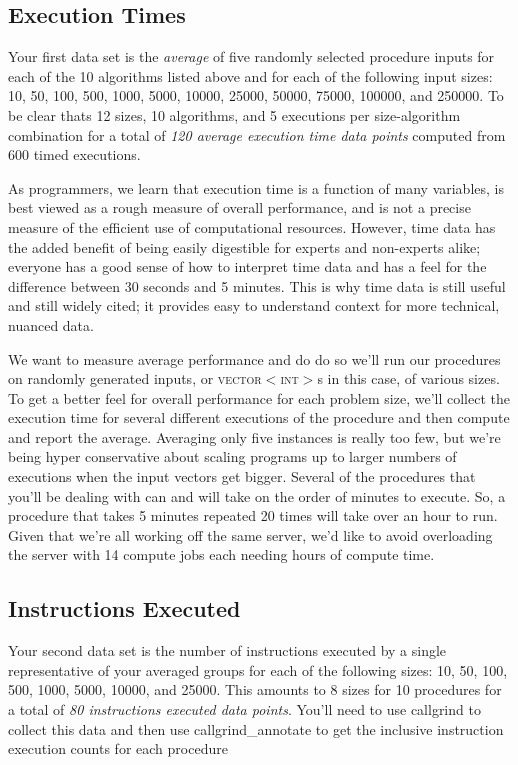 \documentclass[]{tufte-handout}
\begin{document}
\subsection{Execution Times}

Your first data set is the \textit{average} of five randomly selected procedure inputs for each of the 10 algorithms listed above and for each of the following input sizes: 10, 50, 100, 500, 1000, 5000, 10000, 25000, 50000, 75000, 100000, and 250000. To be clear thats 12 sizes, 10 algorithms, and 5 executions per size-algorithm combination for a total of \textit{120 average execution time data points} computed from 600 timed executions.

As programmers, we learn that execution time is a function of many variables, is best viewed as a rough measure of overall performance, and is not a precise measure of the efficient use of computational resources.  However, time data has the added benefit of being easily digestible for experts and non-experts alike; everyone has a good sense of how to interpret time data and has a feel for the difference between 30 seconds and 5 minutes. This is why time data is still useful and still widely cited; it provides easy to understand context for more technical, nuanced data.

We want to measure average performance and do do so we'll run our procedures on randomly generated inputs, or \textsc{vector$<$int$>$}s in this case, of various sizes. To get a better feel for overall performance for each problem size, we'll collect the execution time for several different executions of the procedure and then compute and report the average. Averaging only five instances is really too few, but we're being hyper conservative about scaling programs up to larger numbers of executions when the input vectors get bigger. Several of the procedures that you'll be dealing with can and will take on the order of minutes to execute. So, a procedure that takes 5 minutes repeated 20 times will take over an hour to run. Given that we're all working off the same server, we'd like to avoid overloading the server with 14 compute jobs each needing hours of compute time.

\subsection{Instructions Executed}

Your second data set is the number of instructions executed by a single representative of your averaged groups for each of the following sizes: 10, 50, 100, 500, 1000, 5000, 10000, and 25000. This amounts to 8 sizes for 10 procedures for a total of \textit{80 instructions executed data points}.  You'll need to use callgrind to collect this data and then use callgrind\_annotate to get the inclusive instruction execution counts for each procedure
\end{document}
